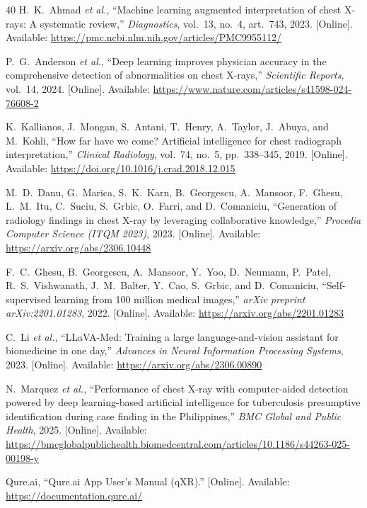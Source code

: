 \documentclass[conference, letterpaper]{IEEEtran}
\begin{document}
\begin{thebibliography}{40}
H.~K.~Ahmad \textit{et al.}, ``Machine learning augmented interpretation of chest X-rays: A systematic review,'' \textit{Diagnostics}, vol.~13, no.~4, art.~743, 2023. [Online]. Available: \url{https://pmc.ncbi.nlm.nih.gov/articles/PMC9955112/}

P.~G.~Anderson \textit{et al.}, ``Deep learning improves physician accuracy in the comprehensive detection of abnormalities on chest X-rays,'' \textit{Scientific Reports}, vol.~14, 2024. [Online]. Available: \url{https://www.nature.com/articles/s41598-024-76608-2}

K.~Kallianos, J.~Mongan, S.~Antani, T.~Henry, A.~Taylor, J.~Abuya, and M.~Kohli, ``How far have we come? Artificial intelligence for chest radiograph interpretation,'' \textit{Clinical Radiology}, vol.~74, no.~5, pp.~338--345, 2019. [Online]. Available: \url{https://doi.org/10.1016/j.crad.2018.12.015}

M.~D.~Danu, G.~Marica, S.~K.~Karn, B.~Georgescu, A.~Mansoor, F.~Ghesu, L.~M.~Itu, C.~Suciu, S.~Grbic, O.~Farri, and D.~Comaniciu, ``Generation of radiology findings in chest X-ray by leveraging collaborative knowledge,'' \textit{Procedia Computer Science (ITQM 2023)}, 2023. [Online]. Available: \url{https://arxiv.org/abs/2306.10448}

F.~C.~Ghesu, B.~Georgescu, A.~Mansoor, Y.~Yoo, D.~Neumann, P.~Patel, R.~S.~Vishwanath, J.~M.~Balter, Y.~Cao, S.~Grbic, and D.~Comaniciu, ``Self-supervised learning from 100 million medical images,'' \textit{arXiv preprint arXiv:2201.01283}, 2022. [Online]. Available: \url{https://arxiv.org/abs/2201.01283}

C.~Li \textit{et al.}, ``LLaVA-Med: Training a large language-and-vision assistant for biomedicine in one day,'' \textit{Advances in Neural Information Processing Systems}, 2023. [Online]. Available: \url{https://arxiv.org/abs/2306.00890}

N.~Marquez \textit{et al.}, ``Performance of chest X-ray with computer-aided detection powered by deep learning-based artificial intelligence for tuberculosis presumptive identification during case finding in the Philippines,'' \textit{BMC Global and Public Health}, 2025. [Online]. Available: \url{https://bmcglobalpublichealth.biomedcentral.com/articles/10.1186/s44263-025-00198-y}

Qure.ai, ``Qure.ai App User's Manual (qXR).'' [Online]. Available: \url{https://documentation.qure.ai/}


\end{thebibliography}
\end{document}
